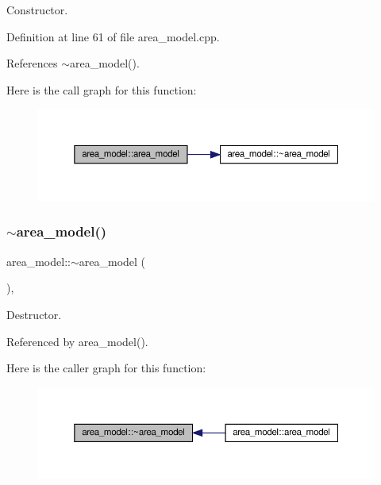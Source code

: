 Constructor. 



Definition at line 61 of file area\+\_\+model.\+cpp.



References $\sim$area\+\_\+model().

Here is the call graph for this function\+:
\nopagebreak
\begin{figure}[H]
\begin{center}
\leavevmode
\includegraphics[width=350pt]{d3/d16/classarea__model_af0ba30d33b5574a55d8b5c6fe642821f_cgraph}
\end{center}
\end{figure}
\mbox{\label{classarea__model_acb398b80dddd92ad4622157a57dd8b2d}} 
\subsubsection{\texorpdfstring{$\sim$area\+\_\+model()}{~area\_model()}}
{\footnotesize\ttfamily area\+\_\+model\+::$\sim$area\+\_\+model (\begin{DoxyParamCaption}{ }\end{DoxyParamCaption})\hspace{0.3cm}{\ttfamily [virtual]}, {\ttfamily [default]}}



Destructor. 



Referenced by area\+\_\+model().

Here is the caller graph for this function\+:
\nopagebreak
\begin{figure}[H]
\begin{center}
\leavevmode
\includegraphics[width=350pt]{d3/d16/classarea__model_acb398b80dddd92ad4622157a57dd8b2d_icgraph}
\end{center}
\end{figure}


